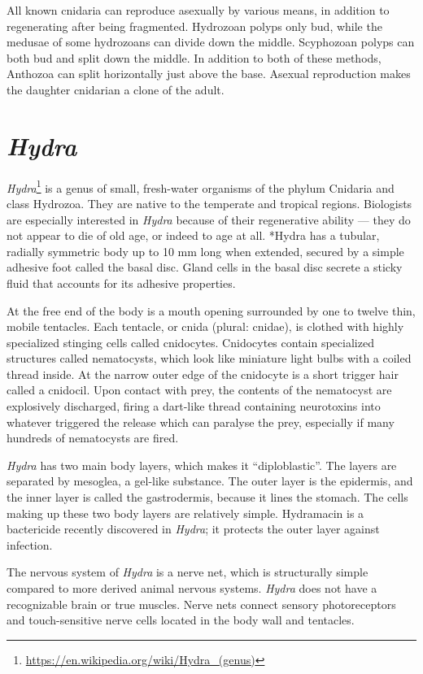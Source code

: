 \documentclass[]{book}
\let\rmarkdownfootnote\footnote%
\def\footnote{\protect\rmarkdownfootnote}
\renewcommand{\href}[2]{#2\footnote{\url{#1}}}
\begin{document}
All known cnidaria can reproduce asexually by various means, in addition to regenerating after being fragmented. Hydrozoan polyps only bud, while the medusae of some hydrozoans can divide down the middle. Scyphozoan polyps can both bud and split down the middle. In addition to both of these methods, Anthozoa can split horizontally just above the base. Asexual reproduction makes the daughter cnidarian a clone of the adult.

\hypertarget{hydra}{%
\section{\texorpdfstring{\emph{Hydra}}{Hydra}}\label{hydra}}

\href{https://en.wikipedia.org/wiki/Hydra_(genus)}{\emph{Hydra}} is a genus of small, fresh-water organisms of the phylum Cnidaria and class Hydrozoa. They are native to the temperate and tropical regions. Biologists are especially interested in \emph{Hydra} because of their regenerative ability --- they do not appear to die of old age, or indeed to age at all.
*Hydra has a tubular, radially symmetric body up to 10 mm long when extended, secured by a simple adhesive foot called the basal disc. Gland cells in the basal disc secrete a sticky fluid that accounts for its adhesive properties.

At the free end of the body is a mouth opening surrounded by one to twelve thin, mobile tentacles. Each tentacle, or cnida (plural: cnidae), is clothed with highly specialized stinging cells called cnidocytes. Cnidocytes contain specialized structures called nematocysts, which look like miniature light bulbs with a coiled thread inside. At the narrow outer edge of the cnidocyte is a short trigger hair called a cnidocil. Upon contact with prey, the contents of the nematocyst are explosively discharged, firing a dart-like thread containing neurotoxins into whatever triggered the release which can paralyse the prey, especially if many hundreds of nematocysts are fired.

\emph{Hydra} has two main body layers, which makes it ``diploblastic''. The layers are separated by mesoglea, a gel-like substance. The outer layer is the epidermis, and the inner layer is called the gastrodermis, because it lines the stomach. The cells making up these two body layers are relatively simple. Hydramacin is a bactericide recently discovered in \emph{Hydra}; it protects the outer layer against infection.

The nervous system of \emph{Hydra} is a nerve net, which is structurally simple compared to more derived animal nervous systems. \emph{Hydra} does not have a recognizable brain or true muscles. Nerve nets connect sensory photoreceptors and touch-sensitive nerve cells located in the body wall and tentacles.
\end{document}
